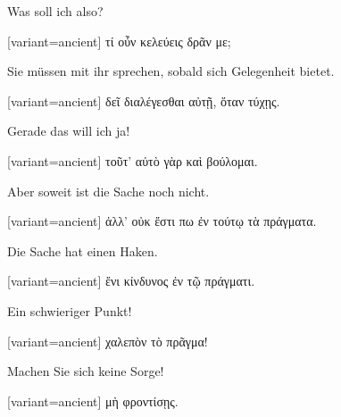 Was soll ich also? 

\switchcolumn

\begin{greek}[variant=ancient]%
τί οὖν κελεύεις δρᾶν με;

\end{greek}%
\switchcolumn*

Sie müssen mit ihr sprechen, sobald sich Gelegenheit bietet. 

\switchcolumn

\begin{greek}[variant=ancient]%
δεῖ διαλέγεσθαι αὐτῇ, ὅταν τύχῃς.

\end{greek}%
\switchcolumn*

Gerade das will ich ja! 

\switchcolumn

\begin{greek}[variant=ancient]%
τοῦτ' αὐτὸ γὰρ καὶ βούλομαι.

\end{greek}%
\switchcolumn*

Aber soweit ist die Sache noch nicht. 

\switchcolumn

\begin{greek}[variant=ancient]%
ἀλλ' οὐκ ἔστι πω ἐν τούτῳ τὰ πράγματα.

\end{greek}%
\switchcolumn*

Die Sache hat einen Haken. 

\switchcolumn

\begin{greek}[variant=ancient]%
ἔνι κίνδυνος ἐν τῷ πράγματι.

\end{greek}%
\switchcolumn*

Ein schwieriger Punkt! 

\switchcolumn

\begin{greek}[variant=ancient]%
χαλεπὸν τὸ πρᾶγμα!

\end{greek}%
\switchcolumn*

Machen Sie sich keine Sorge! 

\switchcolumn

\begin{greek}[variant=ancient]%
μὴ φροντίσῃς.

\end{greek}%
\switchcolumn*

